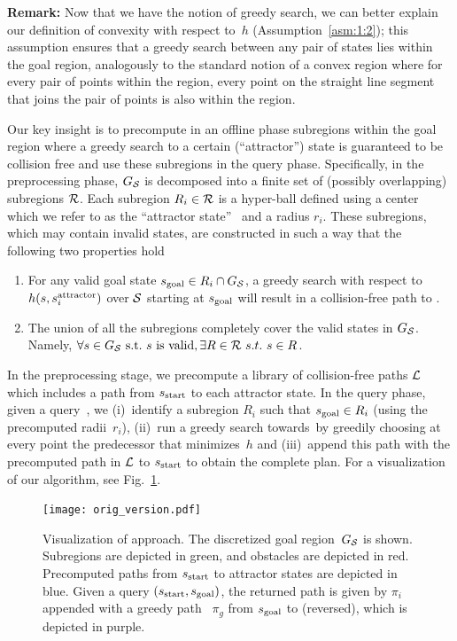 \documentclass[a4paper]{report}
\begin{document}
\textbf{Remark:} Now that we have the notion of greedy search, we can better explain our definition of convexity with respect to~$h$ (Assumption~\ref{asm:1:2});
this assumption ensures that a greedy search between any pair of states lies within the goal region, analogously to the standard notion of a convex region where for every pair of points within the region, every point on the straight line segment that joins the pair of points is also within the region.

Our key insight is to precompute in an offline phase subregions within the goal region where a greedy search to a certain (``attractor'') state is guaranteed to be collision free and use these subregions in the query phase.
Specifically, in the preprocessing phase, $G_\mathcal{S}$ is decomposed into a finite  set of (possibly overlapping) subregions $\mathcal{R}$.
Each subregion $R_i \in \mathcal{R}$ is a hyper-ball defined using a center which we refer to as the ``attractor state''~
\sAttract and a radius $r_i$.
These subregions, which may contain invalid states, are constructed in such a way that the following two properties hold
\begin{enumerate}[label={\textbf{P\arabic*}}]
  \item \label{property:1} For any valid goal state $s_{\text{goal}} \in R_i \cap G_\mathcal{S}$, a greedy search with respect to $h(s, s^{\text{attractor}}_i)$ over $\mathcal{S}$ starting at $s_{\text{goal}}$ will result in a collision-free path to \sAttract.
  \item \label{property:2} The union of all the subregions completely cover the valid states in $G_\mathcal{S}$. 
      Namely, $\forall s \in G_\mathcal{S}~\text{s.t.}~s~\text{is valid}, \exists R \in \mathcal{R} \ s.t. \ s \in R$.
\end{enumerate}

In the preprocessing stage, we precompute a library of collision-free paths $\mathcal{L}$ which includes a path from $s_{\textrm{start}}$ to each attractor state. 
In the query phase, given a query~\sGoal, we 
(i)~identify a subregion $R_i$ such that $s_{\text{goal}} \in R_i$ (using the precomputed radii~$r_i$),
(ii)~run a greedy search towards~\sAttract by greedily choosing at every point the predecessor that minimizes~$h$ and
(iii)~append this path with the precomputed path in $\mathcal{L}$ to $s_{\textrm{start}}$ to obtain the complete plan.
For a visualization of our algorithm, see Fig.~\ref{fig:approach}.


\begin{figure}
\centering
\texttt{[image: orig\_version.pdf]}
  \caption{
  Visualization of approach. The discretized goal region~$G_\mathcal{S}$ is shown. Subregions are depicted in green, and  obstacles are depicted in red.
  Precomputed paths from $s_{\rm{start}}$ to attractor states are depicted in blue.
 Given a query $(s_{\rm{start}}, s_{\rm{goal}})$, the returned path is given by $\pi_i$ appended with a greedy path ~$\pi_g$ from $s_{\rm{goal}}$ to \sAttract (reversed), which is depicted in purple.
}
    \label{fig:approach}
\end{figure}
\end{document}
